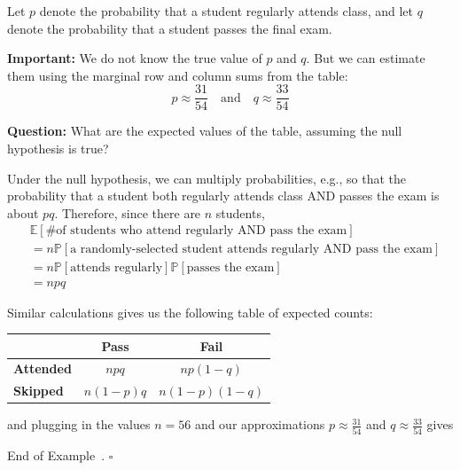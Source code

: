 \documentclass[10pt]{article}
\theoremstyle{definition}
\newtheorem{example}[theorem]{Example}
\renewenvironment{example}
{\begin{oldexample}}
  {\par\smallskip\hfill   End of Example~\theexample. $\square$    \par\end{oldexample}}
\newcommand{\vt}{\vskip 5mm} %
\newcommand{\fl}{\noindent\textbf} %
\newcommand{\Fl}{\vt\noindent\textbf} %
\newcommand{\1}[1]{\textbf{1}_{\left[#1\right]}} %
\def\E{\mathbb{E}} %
\def\P{\mathbb{P}} %
\begin{document}
\begin{example}[Test of independence]
Let $p$ denote the probability that a student regularly attends class, and let
$q$ denote the probability that a student passes the final exam.

\fl{Important:} We do not know the true value of $p$ and $q$. But we can
estimate them using the marginal row and column sums from the table:
\begin{equation*}
  p \approx \frac{31}{54} \quad \text{and} \quad q\approx \frac{33}{54}
\end{equation*}


\Fl{Question:} What are the expected values of the table, assuming the null
hypothesis is true?


Under the null hypothesis, we can multiply probabilities, e.g., so that the
probability that a student both regularly attends class AND passes the exam is
about $pq$. Therefore, since there are $n$ students,
\begin{align*}
  &\E\left[\text{\# of students who attend regularly AND pass the exam}\right] \\
  &= n \P\left[\text{a randomly-selected student attends regularly AND pass the exam} \right]\\
  &= n \P\left[\text{attends regularly}\right] \P\left[\text{passes the exam} \right]\\
  &= npq
\end{align*}

Similar calculations gives us the following table of expected counts:
\begin{center}
  \begin{tabular}{l|cc}
    & \textbf{Pass} & \textbf{Fail} \\
    \hline
    \textbf{Attended} & $npq$          & $np(1-q)$            \\
    \textbf{Skipped}  & $n(1-p)q$           & $n(1-p)(1-q)$            
  \end{tabular}
\end{center}
and plugging in the values $n=56$ and our approximations
$p\approx \frac{31}{54}$ and $q\approx \frac{33}{54}$ gives


\end{example}
\end{document}
